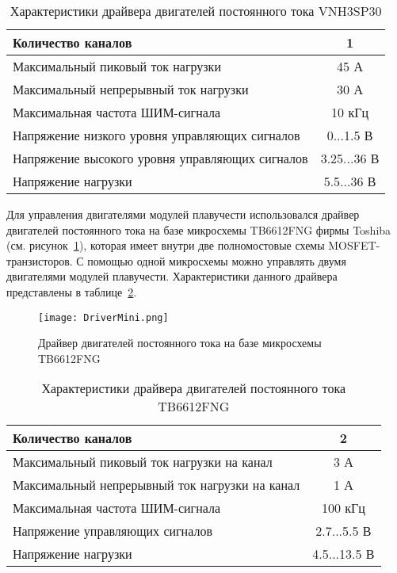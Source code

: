 \begin{table}[h]
	\centering
	\caption{Характеристики драйвера двигателей постоянного тока VNH3SP30}\label{tabVnh}
	\begin{tabular}{|l|c|}
		\hline
		Количество каналов	&	1 	\\ \hline
		Максимальный пиковый ток нагрузки	&	45 А 	\\ \hline
		Максимальный непрерывный ток нагрузки  	&	30 А \\ \hline
		Максимальная частота ШИМ-сигнала 	& 10 кГц \\ \hline
		Напряжение низкого уровня управляющих сигналов &  0...1.5 В\\ \hline
		Напряжение высокого уровня управляющих сигналов &  3.25...36 В\\ \hline
		Напряжение нагрузки & 5.5...36 В \\ \hline
	\end{tabular}
\end{table}

Для управления двигателями модулей плавучести использовался драйвер двигателей постоянного тока на базе микросхемы TB6612FNG фирмы Toshiba (см. рисунок~\ref{DriverMini}), которая имеет внутри две полномостовые схемы MOSFET-транзисторов. С помощью одной микросхемы можно управлять двумя двигателями модулей плавучести. Характеристики данного драйвера представлены в таблице~\ref{tabDriverMini}.

\begin{figure}[h]
	\centering
	\texttt{[image: DriverMini.png]}%
	\caption{Драйвер двигателей постоянного тока на базе микросхемы TB6612FNG}
	\label{DriverMini}
\end{figure}

\begin{table}[h]
	\centering
	\caption{Характеристики драйвера двигателей постоянного тока TB6612FNG}\label{tabDriverMini}
	\begin{tabular}{|l|c|}
		\hline
		Количество каналов	&	2 	\\ \hline
		Максимальный пиковый ток нагрузки на канал	&	3 А 	\\ \hline
		Максимальный непрерывный ток нагрузки на канал 	&	1 А \\ \hline
		Максимальная частота ШИМ-сигнала 	& 100 кГц \\ \hline
		Напряжение управляющих сигналов &  2.7...5.5 В\\ \hline
		Напряжение нагрузки & 4.5...13.5 В \\ \hline
	\end{tabular}
\end{table}


